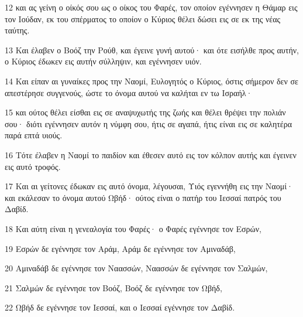 \par 12 και ας γείνη ο οίκός σου ως ο οίκος του Φαρές, τον οποίον εγέννησεν η Θάμαρ εις τον Ιούδαν, εκ του σπέρματος το οποίον ο Κύριος θέλει δώσει εις σε εκ της νέας ταύτης.
\par 13 Και έλαβεν ο Βοόζ την Ρούθ, και έγεινε γυνή αυτού· και ότε εισήλθε προς αυτήν, ο Κύριος έδωκεν εις αυτήν σύλληψιν, και εγέννησεν υιόν.
\par 14 Και είπαν αι γυναίκες προς την Ναομί, Ευλογητός ο Κύριος, όστις σήμερον δεν σε απεστέρησε συγγενούς, ώστε το όνομα αυτού να καλήται εν τω Ισραήλ·
\par 15 και ούτος θέλει είσθαι εις σε αναψυχωτής της ζωής και θέλει θρέψει την πολιάν σου· διότι εγέννησεν αυτόν η νύμφη σου, ήτις σε αγαπά, ήτις είναι εις σε καλητέρα παρά επτά υιούς.
\par 16 Τότε έλαβεν η Ναομί το παιδίον και έθεσεν αυτό εις τον κόλπον αυτής και έγεινεν εις αυτό τροφός.
\par 17 Και αι γείτονες έδωκαν εις αυτό όνομα, λέγουσαι, Υιός εγεννήθη εις την Ναομί· και εκάλεσαν το όνομα αυτού Ωβήδ· ούτος είναι ο πατήρ του Ιεσσαί πατρός του Δαβίδ.
\par 18 Και αύτη είναι η γενεαλογία του Φαρές· ο Φαρές εγέννησε τον Εσρών,
\par 19 Εσρών δε εγέννησε τον Αράμ, Αράμ δε εγέννησε τον Αμιναδάβ,
\par 20 Αμιναδάβ δε εγέννησε τον Ναασσών, Ναασσών δε εγέννησε τον Σαλμών,
\par 21 Σαλμών δε εγέννησε τον Βοόζ, Βοόζ δε εγέννησε τον Ωβήδ,
\par 22 Ωβήδ δε εγέννησε τον Ιεσσαί, και ο Ιεσσαί εγέννησε τον Δαβίδ.


